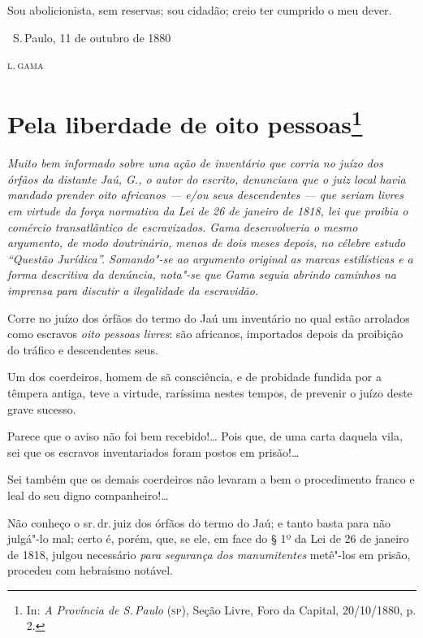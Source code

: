 Sou abolicionista, sem reservas; sou cidadão; creio ter cumprido o meu
dever.

\bigskip

\hfill\ S.\,Paulo, 11 de outubro de 1880\smallskip

\hfill\textsc{l.\,gama}


\chapter{Pela liberdade de oito pessoas\footnote[*]{In: \emph{A Província
  de S.\,Paulo} (\textsc{sp}), Seção Livre, Foro da Capital, 20/10/1880, p. 2.}}

\begin{flushleft}
{\footnotesize\itshape
Muito bem informado sobre uma
ação de inventário que corria no juízo dos órfãos da distante Jaú, G., o
autor do escrito, denunciava que o juiz local havia mandado prender oito
africanos --- e/ou seus descendentes --- que seriam livres em virtude da
força normativa da Lei de 26 de janeiro de 1818, lei que proibia o comércio
transatlântico de escravizados. Gama desenvolveria o mesmo argumento, de
modo doutrinário, menos de dois meses depois, no célebre estudo ``Questão
Jurídica''. Somando"-se ao argumento original as marcas estilísticas e a
forma descritiva da denúncia, nota"-se que Gama seguia abrindo caminhos
na imprensa para discutir a ilegalidade da escravidão. }
\end{flushleft}

Corre no juízo dos órfãos do termo do Jaú um inventário no qual estão
arrolados como escravos \emph{oito pessoas livres}: são africanos,
importados depois da proibição do tráfico e descendentes seus.

Um dos coerdeiros, homem de sã consciência, e de probidade fundida por a
têmpera antiga, teve a virtude, raríssima nestes tempos, de prevenir o
juízo deste grave sucesso.

Parece que o aviso não foi bem recebido!\ldots{} Pois que, de uma carta
daquela vila, sei que os escravos inventariados foram postos em
prisão!\ldots{}

Sei também que os demais coerdeiros não levaram a bem o procedimento
franco e leal do seu digno companheiro!\ldots{}

Não conheço o sr.\,dr.\,juiz dos órfãos do termo do Jaú; e tanto basta
para não julgá"-lo mal; certo é, porém, que, se ele, em face do § 1º da
Lei de 26 de janeiro de 1818, julgou necessário \emph{para segurança dos
manumitentes} metê"-los em prisão, procedeu com hebraísmo notável.

